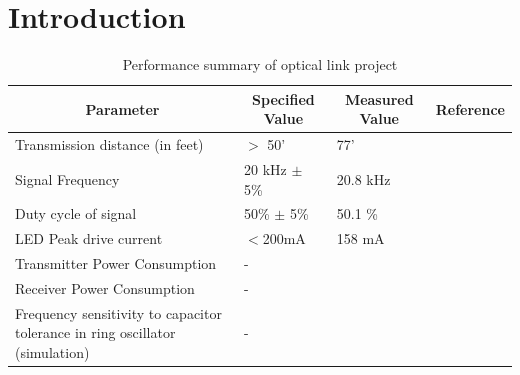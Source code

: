 \documentclass{article}
\begin{document}
\section{Introduction}
\begin{table}[H]
	\centering
	\caption{Performance summary of optical link project}
	\label{tab:opticallink}
	\begin{tabular}{|l|l|l|l|}
		\hline
		\multicolumn{1}{|c|}{\textbf{Parameter}}                                     & \multicolumn{1}{c|}{\textbf{Specified Value}} & \multicolumn{1}{c|}{\textbf{Measured Value}} & \multicolumn{1}{c|}{\textbf{Reference}} \\ \hline
		Transmission distance (in feet)                                              & $>$ 50'                                       & 77'                                          &                                         \\ \hline
		Signal Frequency                                                             & 20 kHz $\pm$ 5\%                              & 20.8 kHz                                     &                                         \\ \hline
		Duty cycle of signal                                                         & 50\% $\pm$ 5\%                                & 50.1 \%                                      &                                         \\ \hline
		LED Peak drive current                                                       & $<$200mA                                      & 158 mA                                       &                                         \\ \hline
		Transmitter Power Consumption                                                & -                                             &                                              &                                         \\ \hline
		Receiver Power Consumption                                                   & -                                             &                                              &                                         \\ \hline
		Frequency sensitivity to capacitor tolerance in ring oscillator (simulation) & -                                             &                                              &                                         \\ \hline
	\end{tabular}
\end{table}
  
\end{document}
